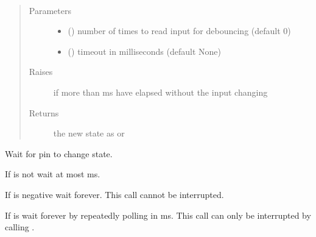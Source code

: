 \documentclass[letterpaper,10pt,english]{sphinxmanual}
\begin{document}
\begin{fulllineitems}
\begin{fulllineitems}
\begin{quote}
\begin{description}
\end{description}\end{quote}

\end{fulllineitems}


\begin{fulllineitems}
\label{\detokenize{index:rcpy.gpio.Input.high_or_low}}~\begin{quote}\begin{description}
\item[{Parameters}] \leavevmode\begin{itemize}
\item {} 
 () \textendash{} number of times to read input for debouncing (default 0)

\item {} 
 () \textendash{} timeout in milliseconds (default None)

\end{itemize}

\item[{Raises}] \leavevmode
{\hyperref[\detokenize{index:rcpy.gpio.InputTimeout}]{}} \textendash{} if more than  ms have elapsed without the input changing

\item[{Returns}] \leavevmode
the new state as {\hyperref[\detokenize{index:rcpy.gpio.HIGH}]{}} or {\hyperref[\detokenize{index:rcpy.gpio.LOW}]{}}

\end{description}\end{quote}

Wait for pin to change state.

If  is not  wait at most  ms.

If  is negative wait forever. This call cannot be interrupted.

If  is  wait forever by repeatedly polling in {\hyperref[\detokenize{index:rcpy.gpio.POLL_TIMEOUT}]{}} ms. This call can only be interrupted by calling {\hyperref[\detokenize{index:rcpy.exit}]{}}.


\end{fulllineitems}
\end{fulllineitems}
\end{document}
